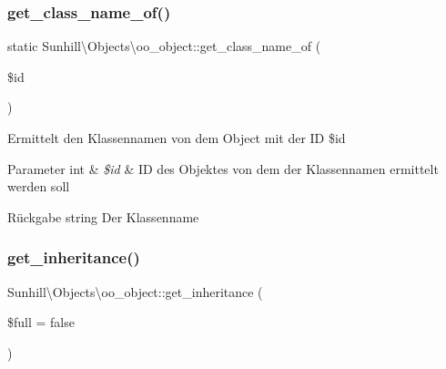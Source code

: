 \mbox{\label{classSunhill_1_1Objects_1_1oo__object_a008bfcc646336ee5c6219b3c73f4c214}} 
\subsubsection{\texorpdfstring{get\+\_\+class\+\_\+name\+\_\+of()}{get\_class\_name\_of()}}
{\footnotesize\ttfamily static Sunhill\textbackslash{}\+Objects\textbackslash{}oo\+\_\+object\+::get\+\_\+class\+\_\+name\+\_\+of (\begin{DoxyParamCaption}\item[{}]{\$id }\end{DoxyParamCaption})\hspace{0.3cm}{\ttfamily [static]}}

Ermittelt den Klassennamen von dem Object mit der ID \$id 
\begin{DoxyParams}[1]{Parameter}
int & {\em \$id} & ID des Objektes von dem der Klassennamen ermittelt werden soll \\
\hline
\end{DoxyParams}
\begin{DoxyReturn}{Rückgabe}
string Der Klassenname 
\end{DoxyReturn}
\mbox{\label{classSunhill_1_1Objects_1_1oo__object_a022b85913cd018dcdcb35b5709cfa2d0}} 
\subsubsection{\texorpdfstring{get\+\_\+inheritance()}{get\_inheritance()}}
{\footnotesize\ttfamily Sunhill\textbackslash{}\+Objects\textbackslash{}oo\+\_\+object\+::get\+\_\+inheritance (\begin{DoxyParamCaption}\item[{}]{\$full = {\ttfamily false} }\end{DoxyParamCaption})}

